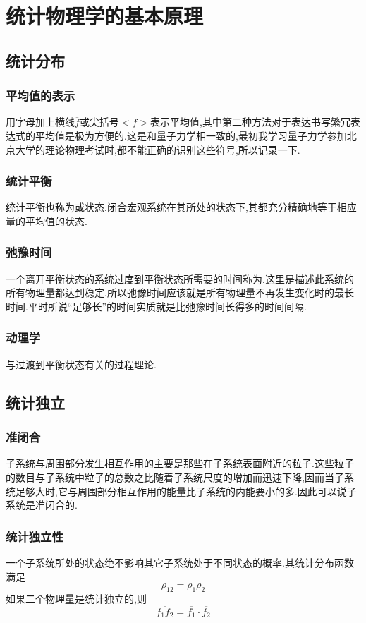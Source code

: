 \chapter{统计物理学的基本原理}
\section{统计分布}
\subsection{平均值的表示}
用字母加上横线$\overline{f}$或尖括号$<f>$表示平均值,其中第二种方法对于表达书写繁冗表达式的平均值是极为方便的.这是和量子力学相一致的,最初我学习量子力学参加北京大学的理论物理考试时,都不能正确的识别这些符号,所以记录一下.
\subsection{统计平衡}
统计平衡也称为或状态.闭合宏观系统在其所处的状态下,其都充分精确地等于相应量的平均值的状态.
\subsection{弛豫时间}
一个离开平衡状态的系统过度到平衡状态所需要的时间称为.这里是描述此系统的所有物理量都达到稳定,所以弛豫时间应该就是所有物理量不再发生变化时的最长时间.平时所说``足够长''的时间实质就是比弛豫时间长得多的时间间隔.
\subsection{动理学}
与过渡到平衡状态有关的过程理论.
\section{统计独立}
\subsection{准闭合}
子系统与周围部分发生相互作用的主要是那些在子系统表面附近的粒子.这些粒子的数目与子系统中粒子的总数之比随着子系统尺度的增加而迅速下降,因而当子系统足够大时,它与周围部分相互作用的能量比子系统的内能要小的多.因此可以说子系统是{\color{red}准闭合}的.
\subsection{统计独立性}
一个子系统所处的状态绝不影响其它子系统处于不同状态的概率.其统计分布函数满足
\begin{equation}
  \rho_{12}=\rho_1\rho_2
\end{equation}
如果二个物理量是统计独立的,则
\begin{equation}
  \overline{f_1f_2}=\overline{f_1}\cdot\overline{f_2}
\end{equation}
